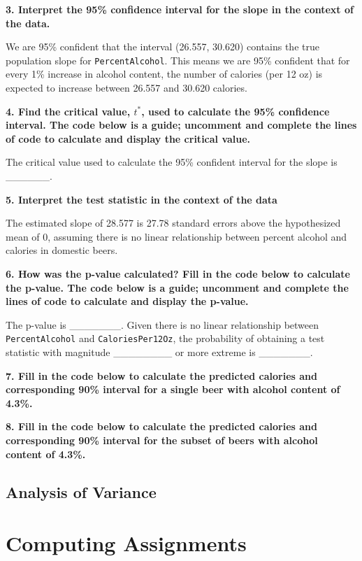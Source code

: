 \documentclass[]{book}
\begin{document}
\textbf{3. Interpret the 95\% confidence interval for the slope in the
context of the data.}

We are 95\% confident that the interval (26.557, 30.620) contains the
true population slope for \texttt{PercentAlcohol}. This means we are
95\% confident that for every 1\% increase in alcohol content, the
number of calories (per 12 oz) is expected to increase between 26.557
and 30.620 calories.

\textbf{4. Find the critical value, \(t^*\), used to calculate the 95\%
confidence interval. The code below is a guide; uncomment and complete
the lines of code to calculate and display the critical value.}

The critical value used to calculate the 95\% confident interval for the
slope is \_\_\_\_\_\_.

\textbf{5. Interpret the test statistic in the context of the data}

The estimated slope of 28.577 is 27.78 standard errors above the
hypothesized mean of 0, assuming there is no linear relationship between
percent alcohol and calories in domestic beers.

\textbf{6. How was the p-value calculated? Fill in the code below to
calculate the p-value. The code below is a guide; uncomment and complete
the lines of code to calculate and display the p-value.}

The p-value is \_\_\_\_\_\_\_. Given there is no linear relationship
between \texttt{PercentAlcohol} and \texttt{CaloriesPer12Oz}, the
probability of obtaining a test statistic with magnitude
\_\_\_\_\_\_\_\_ or more extreme is \_\_\_\_\_\_\_.

\textbf{7. Fill in the code below to calculate the predicted calories
and corresponding 90\% interval for a single beer with alcohol content
of 4.3\%.}

\textbf{8. Fill in the code below to calculate the predicted calories
and corresponding 90\% interval for the subset of beers with alcohol
content of 4.3\%.}

\chapter{Analysis of Variance}\label{anova}

\part*{Computing
Assignments}\label{part-computing-assignments}
\end{document}
